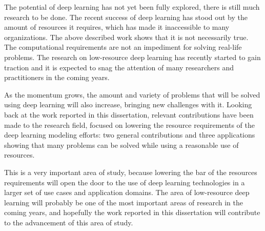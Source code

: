 The potential of deep learning has not yet been fully explored, there is still much research to be done. The recent success of deep learning has stood out by the amount of resources it requires, which has made it inaccessible to many organizations. The above described work shows that it is not necessarily true. The computational requirements are not an impediment for solving real-life problems. The research on low-resource deep learning has recently started to gain traction and it is expected to snag the attention of many researchers and practitioners in the coming years. 

As the momentum grows, the amount and variety of problems that will be solved using deep learning will also increase, bringing new challenges with it. Looking back at the work reported in this dissertation, relevant contributions have been made to the research field, focused on lowering the resource requirements of the deep learning modeling efforts: two general contributions and three applications showing that many problems can be solved while using a reasonable use of resources. 

This is a very important area of study, because lowering the bar of the resources requirements will open the door to the use of deep learning technologies in a larger set of use cases and application domains.  The area of low-resource deep learning will probably be one of the most important areas of research in the coming years, and hopefully the work reported in this dissertation will contribute to the advancement of this area of study.

